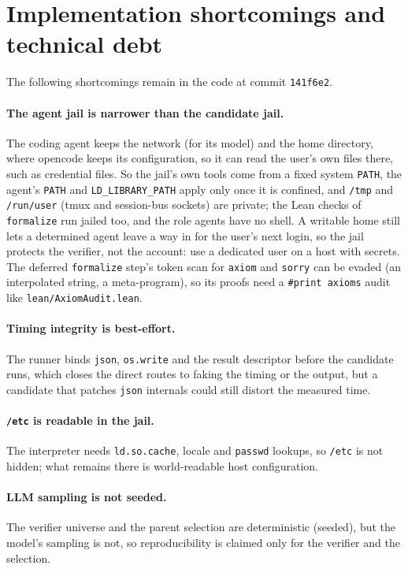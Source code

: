 \section{Implementation shortcomings and technical debt}
\label{sec:impl-shortcomings}

The following shortcomings remain in the code at commit \texttt{141f6e2}.

\paragraph{The agent jail is narrower than the candidate jail.} The coding
agent keeps the network (for its model) and the home directory, where opencode
keeps its configuration, so it can read the user's own files there, such as
credential files. So the jail's own tools come from a fixed system
\texttt{PATH}, the agent's \texttt{PATH} and \texttt{LD\_LIBRARY\_PATH} apply only
once it is confined, and \texttt{/tmp} and \texttt{/run/user} (tmux and
session-bus sockets) are private; the Lean checks of \texttt{formalize} run jailed
too, and the role agents have no shell. A writable home still lets a determined
agent leave a way in for the user's next login, so the jail protects the
verifier, not the account: use a dedicated user on a host with secrets.
The deferred \texttt{formalize} step's token scan for \texttt{axiom} and
\texttt{sorry} can be evaded (an interpolated string, a meta-program), so its
proofs need a \texttt{\#print axioms} audit like \texttt{lean/AxiomAudit.lean}.

\paragraph{Timing integrity is best-effort.} The runner binds \texttt{json},
\texttt{os.write} and the result descriptor before the candidate runs, which
closes the direct routes to faking the timing or the output, but a candidate
that patches \texttt{json} internals could still distort the measured time.

\paragraph{\texttt{/etc} is readable in the jail.} The interpreter needs
\texttt{ld.so.cache}, locale and \texttt{passwd} lookups, so \texttt{/etc} is
not hidden; what remains there is world-readable host configuration.

\paragraph{LLM sampling is not seeded.} The verifier universe and the parent
selection are deterministic (seeded), but the model's sampling is not, so
reproducibility is claimed only for the verifier and the selection.

